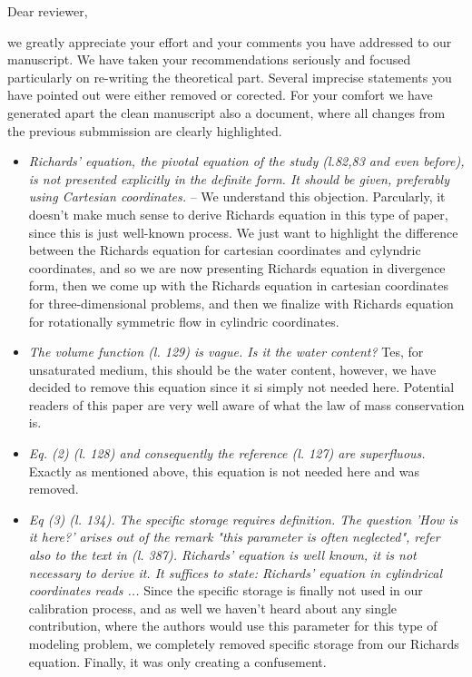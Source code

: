 \documentclass[a4paper,10pt]{letter}
\begin{document}

Dear reviewer,

we greatly appreciate your effort and your comments you have addressed to our manuscript. We have taken your recommendations seriously and focused particularly on re-writing the theoretical part. Several imprecise statements you have pointed out were either removed or corected. For your comfort we have generated apart the clean manuscript also a document, where all changes from the previous submmission are clearly highlighted.

\begin{itemize}
\item {\it Richards' equation, the pivotal equation of the study (l.82,83 and
  even before), is not presented explicitly in the definite form. It
  should be given, preferably using Cartesian coordinates.} -- We understand this objection. Parcularly, it doesn't make much sense to derive Richards equation in this type of paper, since this is just well-known process. We just want to highlight the difference between the Richards equation for cartesian coordinates and cylyndric coordinates, and so we are now presenting Richards equation in divergence form, then we come up with the Richards equation in cartesian coordinates for three-dimensional problems, and then we finalize with Richards equation for rotationally symmetric flow in cylindric coordinates.
  \item {\it  The volume function (l. 129) is vague. Is it the water content?} Tes, for unsaturated medium, this should be the water content, however, we have decided to remove this equation since it si simply not needed here. Potential readers of this paper are very well aware of what the law of mass conservation is.
  \item {\it Eq. (2) (l. 128) and consequently the reference (l. 127) are
  superfluous.} Exactly as mentioned above, this equation is not needed here and was removed.
  \item {\it Eq (3) (l. 134). The specific storage requires definition. The
  question 'How is it here?' arises out of the remark "this parameter
  is often neglected", refer also to the text in (l. 387). Richards'
  equation is well known, it is not necessary to derive it. It suffices
  to state: Richards' equation in cylindrical coordinates reads ...} Since the specific storage is finally not used in our calibration process, and as well we haven't heard about any single contribution, where the authors would use this parameter for this type of modeling problem, we completely removed specific storage from our Richards equation. Finally, it was only creating a confusement.

\end{itemize}
\end{document}
